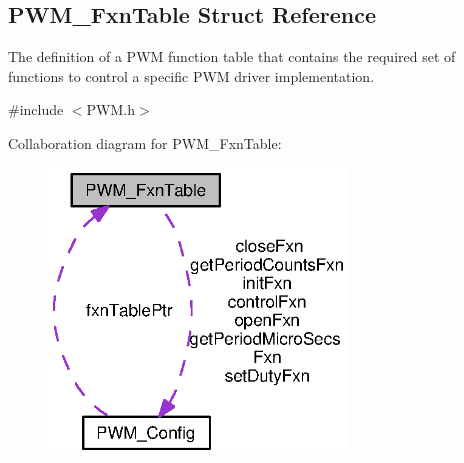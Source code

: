 \subsection{P\-W\-M\-\_\-\-Fxn\-Table Struct Reference}
\label{struct_p_w_m___fxn_table}


The definition of a P\-W\-M function table that contains the required set of functions to control a specific P\-W\-M driver implementation.  




{\ttfamily \#include $<$P\-W\-M.\-h$>$}



Collaboration diagram for P\-W\-M\-\_\-\-Fxn\-Table\-:
\nopagebreak
\begin{figure}[H]
\begin{center}
\leavevmode
\includegraphics[width=225pt]{struct_p_w_m___fxn_table__coll__graph}
\end{center}
\end{figure}
